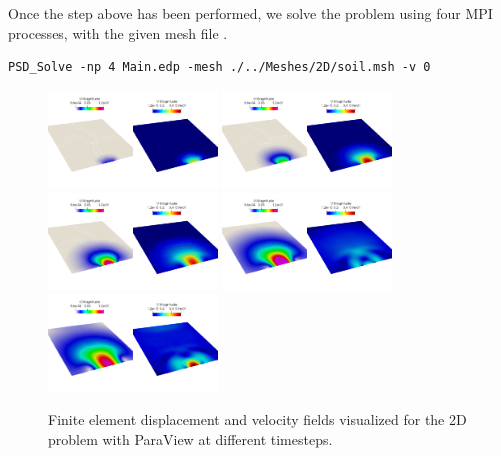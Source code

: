 Once the step above has been performed, we solve the problem using four MPI processes, with the given mesh file . 

\begin{lstlisting}[style=BashInputStyle]
	PSD_Solve -np 4 Main.edp -mesh ./../Meshes/2D/soil.msh -v 0
\end{lstlisting}


\begin{figure}[h!]
	\centering
	\includegraphics[width=0.4\textwidth]{./Images/sd-u0.png}
	\includegraphics[width=0.4\textwidth]{./Images/sd-u1.png}\\
	\includegraphics[width=0.4\textwidth]{./Images/sd-u2.png}
	\includegraphics[width=0.4\textwidth]{./Images/sd-u3.png}\\
	\includegraphics[width=0.4\textwidth]{./Images/sd-u4.png}
	\caption{Finite element displacement and velocity fields visualized for the 2D problem with ParaView at different timesteps. \label{bar-sd}}
\end{figure}

